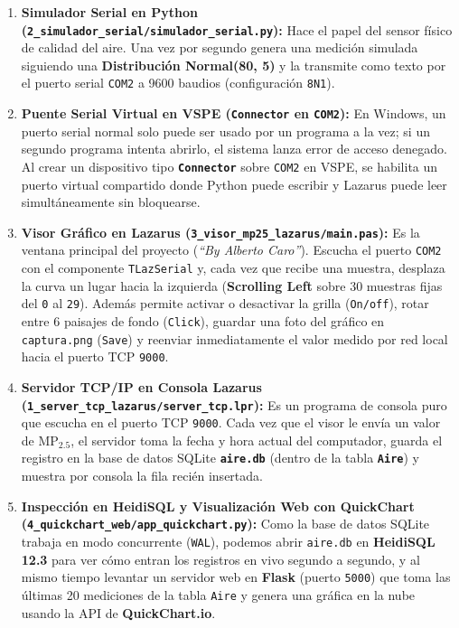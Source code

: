 \documentclass[11pt,a4paper]{article}
\begin{document}
\begin{enumerate}[leftmargin=1.5em, itemsep=0.3em]
    \item \textbf{Simulador Serial en Python (\texttt{2\_simulador\_serial/simulador\_serial.py}):}
    Hace el papel del sensor físico de calidad del aire. Una vez por segundo genera una medición simulada siguiendo una \textbf{Distribución Normal(80, 5)} y la transmite como texto por el puerto serial \texttt{COM2} a 9600 baudios (configuración \texttt{8N1}).

    \item \textbf{Puente Serial Virtual en VSPE (\texttt{Connector} en \texttt{COM2}):}
    En Windows, un puerto serial normal solo puede ser usado por un programa a la vez; si un segundo programa intenta abrirlo, el sistema lanza error de acceso denegado. Al crear un dispositivo tipo \textbf{\texttt{Connector}} sobre \texttt{COM2} en VSPE, se habilita un puerto virtual compartido donde Python puede escribir y Lazarus puede leer simultáneamente sin bloquearse.

    \item \textbf{Visor Gráfico en Lazarus (\texttt{3\_visor\_mp25\_lazarus/main.pas}):}
    Es la ventana principal del proyecto (\emph{``By Alberto Caro''}). Escucha el puerto \texttt{COM2} con el componente \texttt{TLazSerial} y, cada vez que recibe una muestra, desplaza la curva un lugar hacia la izquierda (\textbf{Scrolling Left} sobre 30 muestras fijas del \texttt{0} al \texttt{29}). Además permite activar o desactivar la grilla (\texttt{On/off}), rotar entre 6 paisajes de fondo (\texttt{Click}), guardar una foto del gráfico en \texttt{captura.png} (\texttt{Save}) y reenviar inmediatamente el valor medido por red local hacia el puerto TCP \texttt{9000}.

    \item \textbf{Servidor TCP/IP en Consola Lazarus (\texttt{1\_server\_tcp\_lazarus/server\_tcp.lpr}):}
    Es un programa de consola puro que escucha en el puerto TCP \texttt{9000}. Cada vez que el visor le envía un valor de $\text{MP}_{2.5}$, el servidor toma la fecha y hora actual del computador, guarda el registro en la base de datos SQLite \textbf{\texttt{aire.db}} (dentro de la tabla \textbf{\texttt{Aire}}) y muestra por consola la fila recién insertada.

    \item \textbf{Inspección en HeidiSQL y Visualización Web con QuickChart (\texttt{4\_quickchart\_web/app\_quickchart.py}):}
    Como la base de datos SQLite trabaja en modo concurrente (\texttt{WAL}), podemos abrir \texttt{aire.db} en \textbf{HeidiSQL 12.3} para ver cómo entran los registros en vivo segundo a segundo, y al mismo tiempo levantar un servidor web en \textbf{Flask} (puerto \texttt{5000}) que toma las últimas 20 mediciones de la tabla \texttt{Aire} y genera una gráfica en la nube usando la API de \textbf{QuickChart.io}.
\end{enumerate}
\end{document}
